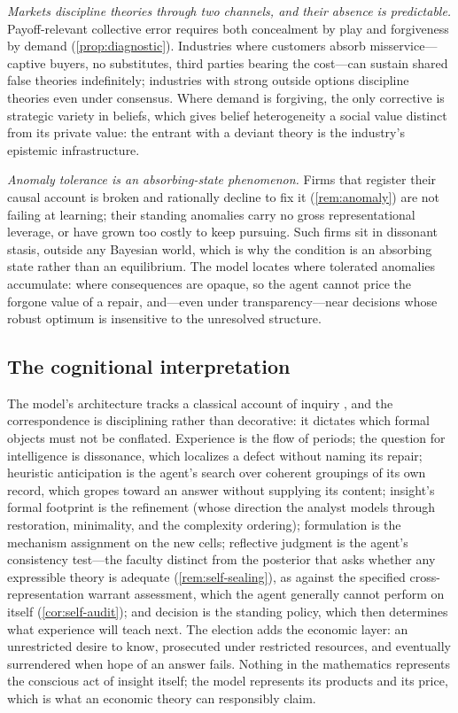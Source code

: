 \documentclass[11pt]{article}
\theoremstyle{definition}
\begin{document}
\emph{Markets discipline theories through two channels, and their absence is predictable.}
Payoff-relevant collective error requires both concealment by play and forgiveness by demand (\cref{prop:diagnostic}).
Industries where customers absorb misservice---captive buyers, no substitutes, third parties bearing the cost---can sustain shared false theories indefinitely; industries with strong outside options discipline theories even under consensus.
Where demand is forgiving, the only corrective is strategic variety in beliefs, which gives belief heterogeneity a social value distinct from its private value: the entrant with a deviant theory is the industry's epistemic infrastructure.

\emph{Anomaly tolerance is an absorbing-state phenomenon.}
Firms that register their causal account is broken and rationally decline to fix it (\cref{rem:anomaly}) are not failing at learning; their standing anomalies carry no gross representational leverage, or have grown too costly to keep pursuing.
Such firms sit in dissonant stasis, outside any Bayesian world, which is why the condition is an absorbing state rather than an equilibrium.
The model locates where tolerated anomalies accumulate: where consequences are opaque, so the agent cannot price the forgone value of a repair, and---even under transparency---near decisions whose robust optimum is insensitive to the unresolved structure.

\subsection{The cognitional interpretation}

The model's architecture tracks a classical account of inquiry \citep{Lonergan1992,RyallWilkins2018}, and the correspondence is disciplining rather than decorative: it dictates which formal objects must not be conflated.
Experience is the flow of periods; the question for intelligence is dissonance, which localizes a defect without naming its repair; heuristic anticipation is the agent's search over coherent groupings of its own record, which gropes toward an answer without supplying its content; insight's formal footprint is the refinement (whose direction the analyst models through restoration, minimality, and the complexity ordering); formulation is the mechanism assignment on the new cells; reflective judgment is the agent's consistency test---the faculty distinct from the posterior that asks whether any expressible theory is adequate (\cref{rem:self-sealing}), as against the specified cross-representation warrant assessment, which the agent generally cannot perform on itself (\cref{cor:self-audit}); and decision is the standing policy, which then determines what experience will teach next.
The election adds the economic layer: an unrestricted desire to know, prosecuted under restricted resources, and eventually surrendered when hope of an answer fails.
Nothing in the mathematics represents the conscious act of insight itself; the model represents its products and its price, which is what an economic theory can responsibly claim.
\end{document}
